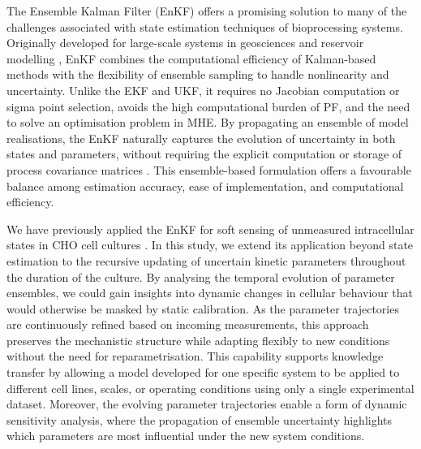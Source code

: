 The Ensemble Kalman Filter (EnKF) offers a promising solution to many of the challenges associated with state estimation techniques of bioprocessing systems. Originally developed for large-scale systems in geosciences and reservoir modelling \cite{Evensen2022DataProblem}, EnKF combines the computational efficiency of Kalman-based methods with the flexibility of ensemble sampling to handle nonlinearity and uncertainty. Unlike the EKF and UKF, it requires no Jacobian computation or sigma point selection, avoids the high computational burden of PF,  and the need to solve an optimisation problem in MHE. By propagating an ensemble of model realisations, the EnKF naturally captures the evolution of uncertainty in both states and parameters, without requiring the explicit computation or storage of process covariance matrices \cite{Evensen2009TheSystems}. This ensemble-based formulation offers a favourable balance among estimation accuracy, ease of implementation, and computational efficiency. 

We have previously applied the EnKF for soft sensing of unmeasured intracellular states in CHO cell cultures \cite{Yu2023EnsembleAntibodies}. In this study, we extend its application beyond state estimation to the recursive updating of uncertain kinetic parameters throughout the duration of the culture. By analysing the temporal evolution of parameter ensembles, we could gain insights into dynamic changes in cellular behaviour that would otherwise be masked by static calibration. As the parameter trajectories are continuously refined based on incoming measurements, this approach preserves the mechanistic structure while adapting flexibly to new conditions without the need for reparametrisation. This capability supports knowledge transfer by allowing a model developed for one specific system to be applied to different cell lines, scales, or operating conditions using only a single experimental dataset. Moreover, the evolving parameter trajectories enable a form of dynamic sensitivity analysis, where the propagation of ensemble uncertainty highlights which parameters are most influential under the new system conditions.

